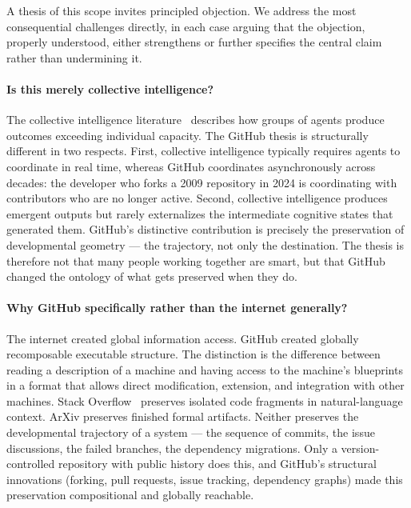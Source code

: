 \documentclass[11pt]{article}
\begin{document}
A thesis of this scope invites principled objection. We address the most
consequential challenges directly, in each case arguing that the objection,
properly understood, either strengthens or further specifies the central claim
rather than undermining it.

\paragraph{Is this merely collective intelligence?}
The collective intelligence literature~\cite{holland1992} describes how groups
of agents produce outcomes exceeding individual capacity. The GitHub thesis
is structurally different in two respects. First, collective intelligence
typically requires agents to coordinate in real time, whereas GitHub
coordinates asynchronously across decades: the developer who forks a 2009
repository in 2024 is coordinating with contributors who are no longer active.
Second, collective intelligence produces emergent outputs but rarely externalizes
the intermediate cognitive states that generated them. GitHub's distinctive
contribution is precisely the preservation of developmental geometry ---
the trajectory, not only the destination. The thesis is therefore not that
many people working together are smart, but that GitHub changed the ontology
of what gets preserved when they do.

\paragraph{Why GitHub specifically rather than the internet generally?}
The internet created global information access. GitHub created globally
recomposable executable structure. The distinction is the difference between
reading a description of a machine and having access to the machine's
blueprints in a format that allows direct modification, extension, and
integration with other machines. Stack Overflow~\cite{raymond1999} preserves
isolated code fragments in natural-language context. ArXiv preserves finished
formal artifacts. Neither preserves the developmental trajectory of a system
--- the sequence of commits, the issue discussions, the failed branches, the
dependency migrations. Only a version-controlled repository with public history
does this, and GitHub's structural innovations (forking, pull requests, issue
tracking, dependency graphs) made this preservation compositional and globally
reachable.
\end{document}
